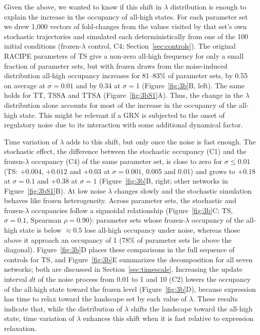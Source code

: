 \documentclass[11pt]{article}
\begin{document}
Given the above, we wanted to know if this shift in $\lambda$ distribution is enough to explain the increase in the occupancy of all-high states. For each parameter set we drew 1{,}000 vectors of fold-changes from the values visited by that set's own stochastic trajectories and simulated each deterministically from one of the 100 initial conditions (frozen-$\lambda$ control, C4; Section~\ref{sec:controls}). The original RACIPE parameters of TS give a non-zero all-high frequency for only a small fraction of parameter sets, but with frozen draws from the noise-induced distribution all-high occupancy increases for 81--83\% of parameter sets, by 0.55 on average at $\sigma = 0.01$ and by 0.34 at $\sigma = 1$ (Figure~\ref{fig:3b}B, left). The same holds for TT, TSSA and TTSA (Figure~\ref{fig:3bS1}A). Thus, the change in the $\lambda$ distribution alone accounts for most of the increase in the occupancy of the all-high state. This might be relevant if a GRN is subjected to the onset of regulatory noise due to its interaction with some additional dynamical factor.

Time variation of $\lambda$ adds to this shift, but only once the noise is fast enough. The stochastic effect, the difference between the stochastic occupancy (C1) and the frozen-$\lambda$ occupancy (C4) of the same parameter set, is close to zero for $\sigma \leq 0.01$ (TS: $+0.004$, $+0.012$ and $+0.03$ at $\sigma = 0.001$, 0.005 and 0.01) and grows to $+0.18$ at $\sigma = 0.1$ and $+0.38$ at $\sigma = 1$ (Figure~\ref{fig:3b}B, right; other networks in Figure~\ref{fig:3bS1}B). At low noise $\lambda$ changes slowly and the stochastic simulation behaves like frozen heterogeneity. Across parameter sets, the stochastic and frozen-$\lambda$ occupancies follow a sigmoidal relationship (Figure~\ref{fig:3b}C; TS, $\sigma = 0.1$, Spearman $\rho = 0.90$): parameter sets whose frozen-$\lambda$ occupancy of the all-high state is below $\approx 0.5$ lose all-high occupancy under noise, whereas those above it approach an occupancy of 1 (78\% of parameter sets lie above the diagonal). Figure~\ref{fig:3b}D places these comparisons in the full sequence of controls for TS, and Figure~\ref{fig:3b}E summarizes the decomposition for all seven networks; both are discussed in Section~\ref{sec:timescale}. Increasing the update interval $dt$ of the noise process from 0.01 to 1 and 10 (C2) lowers the occupancy of the all-high state toward the frozen level (Figure~\ref{fig:3b}D), because expression has time to relax toward the landscape set by each value of $\lambda$. These results indicate that, while the distribution of $\lambda$ shifts the landscape toward the all-high state, time variation of $\lambda$ enhances this shift when it is fast relative to expression relaxation.
\end{document}
